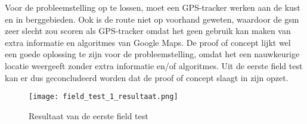 \newline
Voor de probleemstelling op te lossen, moet een GPS-tracker werken aan de kust en in berggebieden. Ook is de route niet op voorhand geweten, waardoor de gsm zeer slecht zou scoren als GPS-tracker omdat het geen gebruik kan maken van extra informatie en algoritmes van Google Maps. De proof of concept lijkt wel een goede oplossing te zijn voor de probleemstelling, omdat het een nauwkeurige locatie weergeeft zonder extra informatie en/of algoritmes. 
\newline
Uit de eerste field test kan er dus geconcludeerd worden dat de proof of concept slaagt in zijn opzet.
\begin{figure}
	\texttt{[image: field\_test\_1\_resultaat.png]}
	\caption{Resultaat van de eerste field test}
	\label{fig:field_test_1_resultaat}
\end{figure}